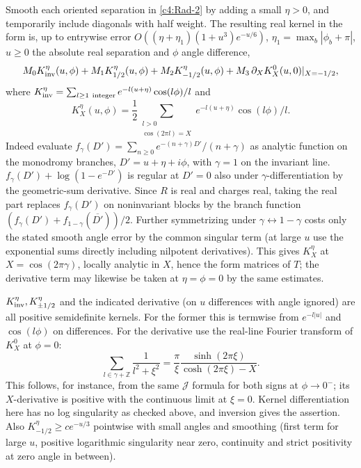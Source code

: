 Smooth each oriented separation in \eqref{c4:Rad-2} by adding a small \(\eta>0\), and temporarily include diagonals with half weight. The resulting real kernel in the form is, up to entrywise error \(O((\eta+\eta_1)(1+u^3)e^{-u/6})\), \(\eta_1=\max_b|\phi_b+\pi|\), \(u\ge0\) the absolute real separation and \(\phi\) angle difference,
\[
 M_0 K_{\rm inv}^\eta(u,\phi)+M_1 K_{1/2}^\eta(u,\phi)+M_2 K_{-1/2}^\eta(u,\phi)
       +M_3\,\partial_X K_X^0(u,0)|_{X=-1/2},
\]
where \(K_{\rm inv}^\eta=\sum_{l\ge1\ {\rm integer}} e^{-l(u+\eta)}\cos(l\phi)/l\) and
\[
 K_X^\eta(u,\phi)=\frac12\sum_{\substack{l>0\\\cos(2\pi l)=X}} e^{-l(u+\eta)}\cos(l\phi)/l .
\]
Indeed evaluate \(f_\gamma(D')=\sum_{n\ge0}e^{-(n+\gamma)D'}/(n+\gamma)\) as analytic function on the monodromy branches, \(D'=u+\eta+i\phi\), with \(\gamma=1\) on the invariant line. \(f_\gamma(D')+\log(1-e^{-D'})\) is regular at \(D'=0\) also under \(\gamma\)-differentiation by the geometric-sum derivative. Since \(R\) is real and charges real, taking the real part replaces \(f_\gamma(D')\) on noninvariant blocks by the branch function \((f_\gamma(D')+f_{1-\gamma}(\overline{D'}))/2\). Further symmetrizing under \(\gamma\leftrightarrow 1-\gamma\) costs only the stated smooth angle error by the common singular term (at large \(u\) use the exponential sums directly including nilpotent derivatives). This gives \(K_X^\eta\) at \(X=\cos(2\pi\gamma)\), locally analytic in \(X\), hence the form matrices of \(T\); the derivative term may likewise be taken at \(\eta=\phi=0\) by the same estimates.

\(K_{\rm inv}^\eta,K_{\pm1/2}^\eta\) and the indicated derivative (on \(u\) differences with angle ignored) are all positive semidefinite kernels. For the former this is termwise from \(e^{-l|u|}\) and \(\cos(l\phi)\) on differences. For the derivative use the real-line Fourier transform of \(K_X^0\) at \(\phi=0\):
\[
 \sum_{l\in\gamma+\mathbb Z}\frac1{l^2+\xi^2}
     =\frac{\pi}{\xi}\frac{\sinh(2\pi\xi)}{\cosh(2\pi\xi)-X}.
\]
This follows, for instance, from the same \(\mathcal J\) formula for both signs at \(\phi\to0^-\); its \(X\)-derivative is positive with the continuous limit at \(\xi=0\). Kernel differentiation here has no log singularity as checked above, and inversion gives the assertion. Also \(K_{-1/2}^\eta\ge c e^{-u/3}\) pointwise with small angles and smoothing (first term for large \(u\), positive logarithmic singularity near zero, continuity and strict positivity at zero angle in between).

